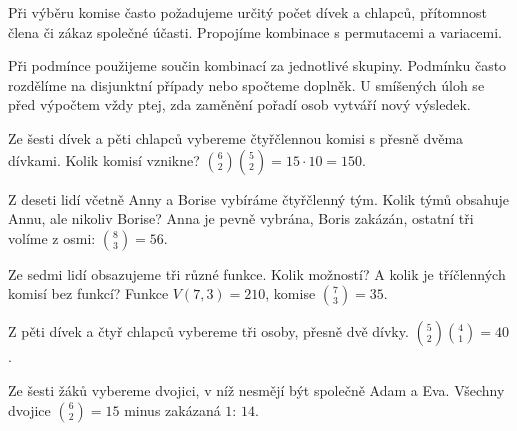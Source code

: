 \documentclass[11pt,a4paper]{article}
\begin{document}

Při výběru komise často požadujeme určitý počet dívek a chlapců, přítomnost člena či zákaz společné účasti. Propojíme kombinace s permutacemi a variacemi.



Při podmínce  použijeme součin kombinací za jednotlivé skupiny. Podmínku  často rozdělíme na disjunktní případy nebo spočteme doplněk. U smíšených úloh se před výpočtem vždy ptej, zda zaměnění pořadí osob vytváří nový výsledek.


\begin{prikladReseniBox}[title={Příklad 1}]
Ze šesti dívek a pěti chlapců vybereme čtyřčlennou komisi s přesně dvěma dívkami. Kolik komisí vznikne?
\tcblower
$\binom62\binom52=15\cdot10=150$.
\end{prikladReseniBox}



\begin{prikladReseniBox}[title={Příklad 2}]
Z deseti lidí včetně Anny a Borise vybíráme čtyřčlenný tým. Kolik týmů obsahuje Annu, ale nikoliv Borise?
\tcblower
Anna je pevně vybrána, Boris zakázán, ostatní tři volíme z osmi: $\binom83=56$.
\end{prikladReseniBox}



\begin{prikladReseniBox}[title={Příklad 3}]
Ze sedmi lidí obsazujeme tři různé funkce. Kolik možností? A kolik je tříčlenných komisí bez funkcí?
\tcblower
Funkce $V(7,3)=210$, komise $\binom73=35$.
\end{prikladReseniBox}




\begin{zadaniReseniBox}[title={Samostatná práce 1}]
Z pěti dívek a čtyř chlapců vybereme tři osoby, přesně dvě dívky.
\tcblower
$\binom52\binom41=40$.
\end{zadaniReseniBox}



\begin{zadaniReseniBox}[title={Samostatná práce 2}]
Ze šesti žáků vybereme dvojici, v níž nesmějí být společně Adam a Eva.
\tcblower
Všechny dvojice $\binom62=15$ minus zakázaná $1$: $14$.
\end{zadaniReseniBox}
\end{document}

